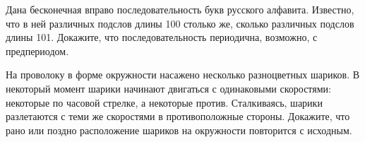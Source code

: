 \documentclass{article}
\begin{document}
\begin{enumerate_boxed}
        \item Дана бесконечная вправо последовательность букв русского алфавита.
        Известно, что в ней
        различных подслов длины 100 столько же, сколько различных подслов длины 101.
        Докажите, что последовательность периодична, возможно, с предпериодом.

        \item На проволоку в форме окружности насажено несколько разноцветных шариков.
        В некоторый момент шарики начинают двигаться с одинаковыми скоростями: некоторые по часовой стрелке, а некоторые против.
        Сталкиваясь, шарики разлетаются с теми же скоростями в противоположные стороны.
        Докажите, что рано или поздно расположение шариков на окружности повторится с исходным.
    \end{enumerate_boxed}
\end{document}

